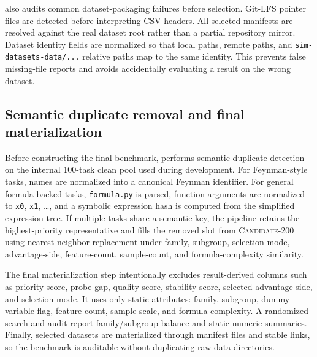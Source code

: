 \arena{} also audits common dataset-packaging failures before selection. Git-LFS pointer files are detected before interpreting CSV headers. All selected manifests are resolved against the real dataset root rather than a partial repository mirror. Dataset identity fields are normalized so that local paths, remote paths, and \texttt{sim-datasets-data/...} relative paths map to the same identity. This prevents false missing-file reports and avoids accidentally evaluating a result on the wrong dataset.

\subsection{Semantic duplicate removal and final materialization}

Before constructing the final benchmark, \arena{} performs semantic duplicate detection on the internal 100-task clean pool used during development. For Feynman-style tasks, names are normalized into a canonical Feynman identifier. For general formula-backed tasks, \texttt{formula.py} is parsed, function arguments are normalized to \texttt{x0}, \texttt{x1}, \ldots, and a symbolic expression hash is computed from the simplified expression tree. If multiple tasks share a semantic key, the pipeline retains the highest-priority representative and fills the removed slot from \textsc{Candidate-200} using nearest-neighbor replacement under family, subgroup, selection-mode, advantage-side, feature-count, sample-count, and formula-complexity similarity.

The final materialization step intentionally excludes result-derived columns such as priority score, probe gap, quality score, stability score, selected advantage side, and selection mode. It uses only static attributes: family, subgroup, dummy-variable flag, feature count, sample scale, and formula complexity. A randomized search and audit report family/subgroup balance and static numeric summaries. Finally, selected datasets are materialized through manifest files and stable links, so the benchmark is auditable without duplicating raw data directories.
